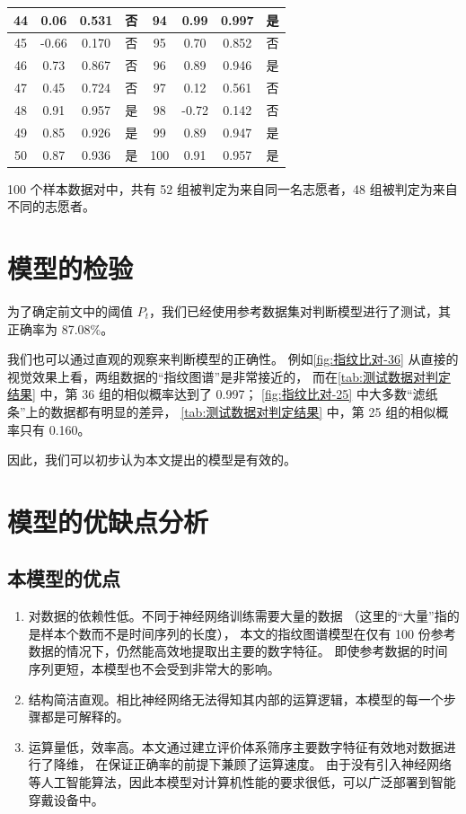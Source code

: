 \documentclass[withoutpreface]{cumcmthesis}
\begin{document}
\begin{longtable}[!htbp]{|c|c|c|c|c|c|c|c|}
        44 & 0.06 & 0.531 & 否 & 94 & 0.99 & 0.997 & 是 \\ \hline
        45 & -0.66 & 0.170 & 否 & 95 & 0.70 & 0.852 & 否 \\ \hline
        46 & 0.73 & 0.867 & 否 & 96 & 0.89 & 0.946 & 是 \\ \hline
        47 & 0.45 & 0.724 & 否 & 97 & 0.12 & 0.561 & 否 \\ \hline
        48 & 0.91 & 0.957 & 是 & 98 & -0.72 & 0.142 & 否 \\ \hline
        49 & 0.85 & 0.926 & 是 & 99 & 0.89 & 0.947 & 是 \\ \hline
        50 & 0.87 & 0.936 & 是 & 100 & 0.91 & 0.957 & 是 \\ \hline
\end{longtable}

100 个样本数据对中，共有 52 组被判定为来自同一名志愿者，48 组被判定为来自不同的志愿者。

\section{模型的检验}

为了确定前文中的阈值 $P_t$，我们已经使用参考数据集对判断模型进行了测试，其正确率为 87.08\%。

我们也可以通过直观的观察来判断模型的正确性。
例如\cref{fig:指纹比对-36} 从直接的视觉效果上看，两组数据的“指纹图谱”是非常接近的，
而在\cref{tab:测试数据对判定结果} 中，第 36 组的相似概率达到了 0.997；
\cref{fig:指纹比对-25} 中大多数“滤纸条”上的数据都有明显的差异，
\cref{tab:测试数据对判定结果} 中，第 25 组的相似概率只有 0.160。

因此，我们可以初步认为本文提出的模型是有效的。

\section{模型的优缺点分析}
\label{pros-and-cons}

\subsection{本模型的优点}

\begin{enumerate}
    \item 对数据的依赖性低。不同于神经网络训练需要大量的数据
    （这里的“大量”指的是样本个数而不是时间序列的长度），
    本文的指纹图谱模型在仅有 100 份参考数据的情况下，仍然能高效地提取出主要的数字特征。
    即使参考数据的时间序列更短，本模型也不会受到非常大的影响。
    \item 结构简洁直观。相比神经网络无法得知其内部的运算逻辑，本模型的每一个步骤都是可解释的。
    \item 运算量低，效率高。本文通过建立评价体系筛序主要数字特征有效地对数据进行了降维，
    在保证正确率的前提下兼顾了运算速度。
    由于没有引入神经网络等人工智能算法，因此本模型对计算机性能的要求很低，可以广泛部署到智能穿戴设备中。
\end{enumerate}
\end{document}
